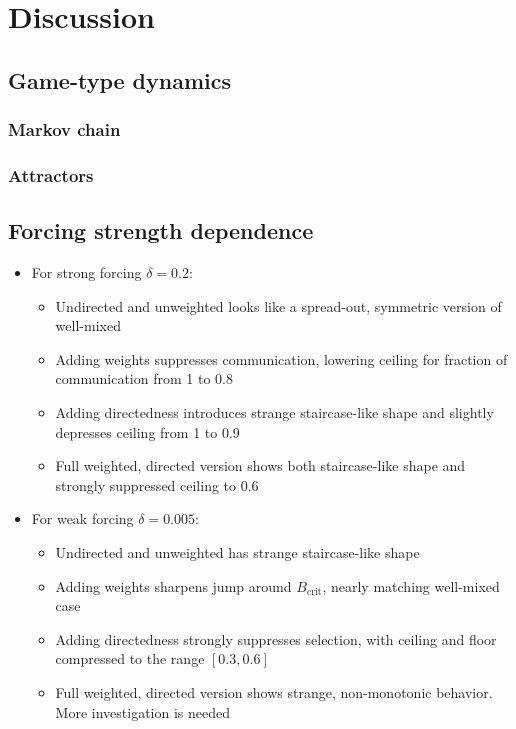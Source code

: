 \documentclass[pdflatex,lineno,referee,sn-mathphys-ay]{class/sn-jnl}
\begin{document}
\section{Discussion}
\subsection{Game-type dynamics}
\subsubsection{Markov chain}
\subsubsection{Attractors}

\subsection{Forcing strength dependence}
\begin{itemize}
  \item For strong forcing $\delta = 0.2$:
  \begin{itemize}
    \item Undirected and unweighted looks like a spread-out, symmetric
      version of well-mixed
    \item Adding weights suppresses communication, lowering ceiling
      for fraction of communication from \num{1} to \num{0.8}
    \item Adding directedness introduces strange staircase-like shape
      and slightly depresses ceiling from \num{1} to \num{0.9}
    \item Full weighted, directed version shows both staircase-like
      shape and strongly suppressed ceiling to \num{0.6}
  \end{itemize}
  \item For weak forcing $\delta = 0.005$:
  \begin{itemize}
    \item Undirected and unweighted has strange staircase-like shape
    \item Adding weights sharpens jump around $B_\text{crit}$, nearly
      matching well-mixed case
    \item Adding directedness strongly suppresses selection, with
      ceiling and floor compressed to the range $[0.3,0.6]$
    \item Full weighted, directed version shows strange, non-monotonic
      behavior. More investigation is needed
  \end{itemize}
\end{itemize}
\end{document}
